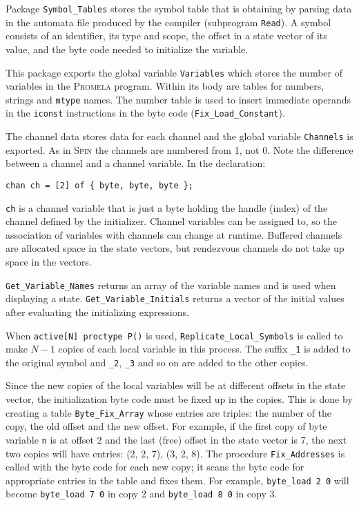 \documentclass[11pt]{article}
\newcommand*{\spn}{\textsc{Spin}}
\newcommand*{\prm}{\textsc{Promela}}
\newcommand*{\p}[1]{\texttt{#1}}
\begin{document}
Package \p{Symbol\_Tables} stores the symbol table that is obtaining by
parsing data in the automata file produced by the compiler (subprogram
\p{Read}). A symbol consists of an identifier, its type and scope, the
offset in a state vector of its value, and the byte code needed to
initialize the variable.

This package exports the global variable \p{Variables} which stores the
number of variables in the \prm{} program. Within its body are tables
for numbers, strings and \p{mtype} names. The number table is used to
insert immediate operands in the \p{iconst} instructions in the byte
code (\p{Fix\_Load\_Constant}).

The channel data stores data for each channel and the global variable
\p{Channels} is exported. As in \spn{} the channels are numbered from 1,
not 0. Note the difference between a channel and a channel variable. In
the declaration:

\begin{footnotesize}
\begin{verbatim}
chan ch = [2] of { byte, byte, byte };
\end{verbatim}
\end{footnotesize}
\p{ch} is a channel variable that is just a byte holding the handle
(index) of the channel defined by the initializer. Channel variables can
be assigned to, so the association of variables with channels can change
at runtime. Buffered channels are allocated space in the state vectors,
but rendezvous channels do not take up space in the vectors.

\p{Get\_Variable\_Names} returns an array of the variable names and is
used when displaying a state. \p{Get\_Variable\_Initials} returns a vector
of the initial values after evaluating the initializing expressions.

When \p{active[N] proctype P()} is used, \p{Replicate\_Local\_Symbols} is
called to make $N-1$ copies of each local variable in this process. The
suffix \p{\_1} is added to the original symbol and \p{\_2}, \p{\_3} and
so on are added to the other copies.

Since the new copies of the local variables will be at different offsets
in the state vector, the initialization byte code must be fixed up in
the copies. This is done by creating a table \p{Byte\_Fix\_Array} whose
entries are triples: the number of the copy, the old offset and the new
offset. For example, if the first copy of byte variable \p{n} is at
offset 2 and the last (free) offset in the state vector is 7, the
next two copies will have entries: (2, 2, 7), (3, 2, 8). The procedure
\p{Fix\_Addresses} is called with the byte code for each new copy;
it scans the byte code for appropriate entries in the table and fixes
them. For example, \p{byte\_load 2 0} will become \p{byte\_load 7 0} in
copy 2 and \p{byte\_load 8 0} in copy 3.
\end{document}
